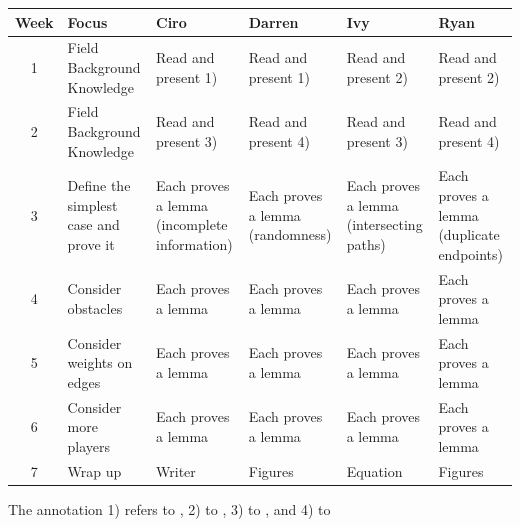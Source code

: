 \begin{table}[h!]
    \centering
    \renewcommand{\arraystretch}{1.3}
    \begin{tabularx}{\textwidth}{|c|X|X|X|X|X|}
    \hline
    \textbf{Week} & \textbf{Focus} & \textbf{Ciro} & \textbf{Darren} & \textbf{Ivy} & \textbf{Ryan} \\
    \hline
    
    1 & Field Background Knowledge 
      & Read and present 1) 
      & Read and present 1) 
      & Read and present 2) 
      & Read and present 2) \\
    \hline
    
    2 & Field Background Knowledge
      & Read and present 3) 
      & Read and present 4) 
      & Read and present 3) 
      & Read and present 4) \\
    \hline
    
    3 & Define the simplest case and prove it 
      & Each proves a lemma (incomplete information)
      & Each proves a lemma (randomness)
      & Each proves a lemma (intersecting paths)
      & Each proves a lemma (duplicate endpoints) \\
    \hline
    
    4 & Consider obstacles
      & Each proves a lemma
      & Each proves a lemma
      & Each proves a lemma
      & Each proves a lemma \\
    \hline
    
    5 & Consider weights on edges
      & Each proves a lemma
      & Each proves a lemma
      & Each proves a lemma
      & Each proves a lemma \\
    \hline
    
    6 & Consider more players
      & Each proves a lemma
      & Each proves a lemma
      & Each proves a lemma
      & Each proves a lemma \\
    \hline
    
    7 & Wrap up
      & Writer
      & Figures
      & Equation
      & Figures \\
    \hline
    
    \end{tabularx}
    \end{table}

The annotation 1) refers to \parencite{One}, 2) to \parencite{Two}, 3) to \parencite{Three}, and 4) to \parencite{Four}
    
